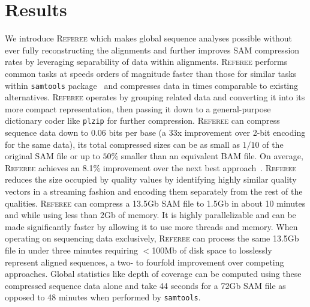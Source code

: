 \documentclass[12pt]{cmuthesis}
\newcommand{\refer}{\textsc{Referee}\xspace}
\begin{document}


\section{Results}

  We introduce \refer which makes global sequence analyses possible without ever fully reconstructing the alignments and further improves SAM compression rates by leveraging separability of data within alignments. \refer performs common tasks at speeds orders of magnitude faster than those for similar tasks within \texttt{samtools} package~\cite{SamTools} and compresses data in times comparable to existing alternatives. \refer operates by grouping related data and converting it into its more compact representation, then passing it down to a general-purpose dictionary coder like \texttt{plzip} for further compression. \refer can compress sequence data down to 0.06 bits per base (a 33x improvement over 2-bit encoding for the same data), its total compressed sizes can be as small as $1/10$ of the original SAM file or up to $50\%$ smaller than an equivalent BAM file. On average, \refer achieves an 8.1\% improvement over the next best approach~\cite{Sahinalp2015}. \refer reduces the size occupied by quality values by identifying highly similar quality vectors in a streaming fashion and encoding them separately from the rest of the qualities. \refer can compress a 13.5Gb SAM file to 1.5Gb in about 10 minutes and while using less than 2Gb of memory. It is highly parallelizable and can be made significantly faster by allowing it to use more threads and memory. When operating on sequencing data exclusively, \refer can process the same 13.5Gb file in under three minutes requiring $<$100Mb of disk space to losslessly represent aligned sequences, a two- to fourfold improvement over competing approaches. Global statistics like depth of coverage can be computed using these compressed sequence data alone and take 44 seconds for a 72Gb SAM file as opposed to 48 minutes when performed by \texttt{samtools}.
\end{document}
